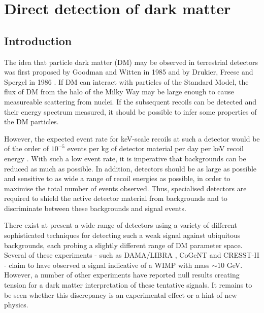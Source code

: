 \chapter{Direct detection of dark matter}
\label{ch:DD}


\section{Introduction}

The idea that particle dark matter (DM) may be observed in terrestrial detectors was first proposed by Goodman and Witten in 1985 \cite{Goodman:1985} and by Drukier, Freese and Spergel in 1986 \cite{Drukier:1986}. If DM can interact with particles of the Standard Model, the flux of DM from the halo of the Milky Way may be large enough to cause measureable scattering from nuclei. If the subsequent recoils can be detected and their energy spectrum measured, it should be possible to infer some properties of the DM particles.

However, the expected event rate for keV-scale recoils at such a detector would be of the order of $10^{-5}$ events per kg of detector material per day per keV recoil energy \cite{Cerdeno:2010}. With such a low event rate, it is imperative that backgrounds can be reduced as much as possible. In addition, detectors should be as large as possible and sensitive to as wide a range of recoil energies as possible, in order to maximise the total number of events observed. Thus, specialised detectors are required to shield the active detector material from backgrounds and to discriminate between these backgrounds and signal events.

There exist at present a wide range of detectors using a variety of different sophisticated techniques for detecting such a weak signal against ubiquitous backgrounds, each probing a slightly different range of DM parameter space. Several of these experiments - such as DAMA/LIBRA \cite{Bernabei:2010}, CoGeNT \cite{Aalseth:2011a, Aalseth:2011b} and CRESST-II \cite{Stodolsky:2012} - claim to have observed a signal indicative of a WIMP with mass $\sim 10$ GeV. However, a number of other experiments have reported null results creating tension for a dark matter interpretation of these tentative signals. It remains to be seen whether this discrepancy is an experimental effect or a hint of new physics. 

